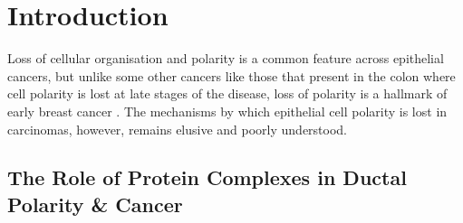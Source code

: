 \section{Introduction}

Loss of cellular organisation and polarity is a common feature across epithelial cancers, but unlike some other cancers like those that present in the colon where cell polarity is lost at late stages of the disease, loss of polarity is a hallmark of early breast cancer \citep{hinck2014}. The mechanisms by which epithelial cell polarity is lost in carcinomas, however, remains elusive and poorly understood.\par

\subsection{The Role of Protein Complexes in Ductal Polarity \& Cancer}

%
%
%
%
%

